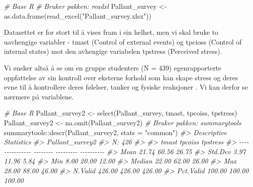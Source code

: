\documentclass[
]{article}
\newenvironment{Shaded}{\begin{snugshade}}{\end{snugshade}}
\newcommand{\AttributeTok}[1]{\textcolor[rgb]{0.77,0.63,0.00}{#1}}
\newcommand{\CommentTok}[1]{\textcolor[rgb]{0.56,0.35,0.01}{\textit{#1}}}
\newcommand{\FunctionTok}[1]{\textcolor[rgb]{0.00,0.00,0.00}{#1}}
\newcommand{\NormalTok}[1]{#1}
\newcommand{\OtherTok}[1]{\textcolor[rgb]{0.56,0.35,0.01}{#1}}
\newcommand{\SpecialCharTok}[1]{\textcolor[rgb]{0.00,0.00,0.00}{#1}}
\newcommand{\StringTok}[1]{\textcolor[rgb]{0.31,0.60,0.02}{#1}}
\begin{document}
\begin{Shaded}
\begin{Highlighting}[]
\CommentTok{\# Base R}
\CommentTok{\# Bruker pakken: readxl}
\NormalTok{Pallant\_survey }\OtherTok{\textless{}{-}} \FunctionTok{as.data.frame}\NormalTok{(}\FunctionTok{read\_excel}\NormalTok{(}\StringTok{"Pallant\_survey.xlsx"}\NormalTok{))}
\end{Highlighting}
\end{Shaded}

Datasettet er for stort til å vises fram i sin helhet, men vi skal bruke to uavhengige variabler - tmast (Control of external events) og tpcioss (Control of internal states) mot den avhengige variabelen tpstress (Perceived stress).

Vi ønsker altså å se om en gruppe studenters (N = 439) egenrapporterte oppfattelse av sin kontroll over eksterne forhold som kan skape stress og deres evne til å kontrollere deres følelser, tanker og fysiske reaksjoner \citep{pallantDevelopmentValidationScale2000}. Vi kan derfor se nærmere på variablene.

\begin{Shaded}
\begin{Highlighting}[]
\CommentTok{\# Base R}
\NormalTok{Pallant\_survey2 }\OtherTok{\textless{}{-}} \FunctionTok{select}\NormalTok{(Pallant\_survey, tmast, tpcoiss, tpstress)}
\NormalTok{Pallant\_survey2 }\OtherTok{\textless{}{-}} \FunctionTok{na.omit}\NormalTok{(Pallant\_survey2) }
\CommentTok{\# Bruker pakken: summarytools}
\NormalTok{summarytools}\SpecialCharTok{::}\FunctionTok{descr}\NormalTok{(Pallant\_survey2, }\AttributeTok{stats =} \StringTok{"common"}\NormalTok{)}
\CommentTok{\#\textgreater{} Descriptive Statistics  }
\CommentTok{\#\textgreater{} Pallant\_survey2  }
\CommentTok{\#\textgreater{} N: 426  }
\CommentTok{\#\textgreater{} }
\CommentTok{\#\textgreater{}                    tmast   tpcoiss   tpstress}
\CommentTok{\#\textgreater{} {-}{-}{-}{-}{-}{-}{-}{-}{-}{-}{-}{-}{-}{-}{-} {-}{-}{-}{-}{-}{-}{-}{-} {-}{-}{-}{-}{-}{-}{-}{-}{-} {-}{-}{-}{-}{-}{-}{-}{-}{-}{-}}
\CommentTok{\#\textgreater{}            Mean    21.74     60.56      26.75}
\CommentTok{\#\textgreater{}         Std.Dev     3.97     11.96       5.84}
\CommentTok{\#\textgreater{}             Min     8.00     20.00      12.00}
\CommentTok{\#\textgreater{}          Median    22.00     62.00      26.00}
\CommentTok{\#\textgreater{}             Max    28.00     88.00      46.00}
\CommentTok{\#\textgreater{}         N.Valid   426.00    426.00     426.00}
\CommentTok{\#\textgreater{}       Pct.Valid   100.00    100.00     100.00}
\end{Highlighting}
\end{Shaded}
\end{document}
